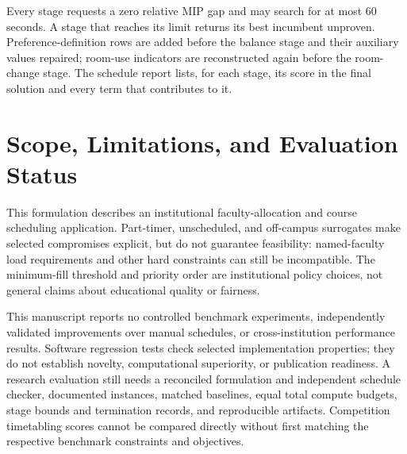 \documentclass[11pt, oneside]{article}   	%
\begin{document}
Every stage requests a zero relative MIP gap and may search for at most 60
seconds. A stage that reaches its limit returns its best incumbent unproven.
Preference-definition rows are added before the balance stage and their
auxiliary values repaired; room-use indicators are reconstructed again before
the room-change stage. The schedule report lists, for each stage, its score in
the final solution and every term that contributes to it.

\section{Scope, Limitations, and Evaluation Status}
This formulation describes an institutional faculty-allocation and course
scheduling application. Part-timer, unscheduled, and off-campus surrogates make
selected compromises explicit, but do not guarantee feasibility: named-faculty
load requirements and other hard constraints can still be incompatible.
The minimum-fill threshold and priority order are institutional policy choices,
not general claims about educational quality or fairness.

This manuscript reports no controlled benchmark experiments, independently
validated improvements over manual schedules, or cross-institution performance
results. Software regression tests check selected implementation properties;
they do not establish novelty, computational superiority, or publication
readiness. A research evaluation still needs a reconciled formulation and
independent schedule checker, documented instances, matched baselines, equal
total compute budgets, stage bounds and termination records, and reproducible
artifacts. Competition timetabling scores cannot be compared directly without
first matching the respective benchmark constraints and objectives.
\end{document}
